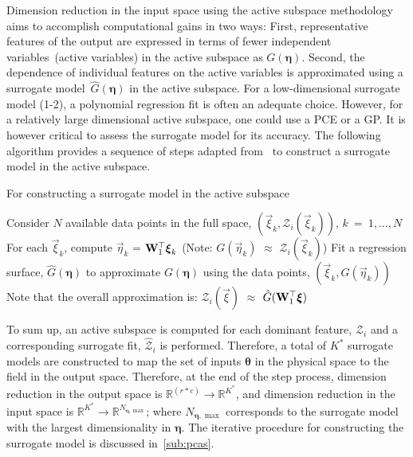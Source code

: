 Dimension reduction in the input space using the active subspace methodology aims to accomplish
computational gains in two ways: First, representative features of the
output are expressed in terms of fewer independent variables~(active variables) in the active subspace 
as $G(\bm{\eta})$. Second, the dependence of individual features on the active variables is approximated 
using a surrogate model~$\hat{G}(\bm{\eta})$ in the active subspace. For a low-dimensional surrogate
model (1-2), a polynomial regression fit is often an adequate choice. 
However, for a relatively large dimensional active subspace, one could
use a PCE or a GP. It is however critical to assess the surrogate model for its accuracy. 
The following algorithm provides a sequence of steps adapted from~\cite{Constantine:2015} to construct a
surrogate model in the active subspace.
%
\bigskip
\begin{breakablealgorithm}
\renewcommand{\algorithmicrequire}{\textbf{Input:}}
\renewcommand{\algorithmicensure}{\textbf{Output:}}
  \caption{For constructing a surrogate model in the active subspace}
  \begin{algorithmic}[1]
	  \State Consider $N$ available data points in the full space, $(\vec\xi_k,\mathcal{Z}_i(\vec\xi_k))$, $k~=~1,\ldots,N$
	  \State For each $\vec\xi_k$, compute $\vec\eta_k$ = $\mat{W}_1^\top\vec\xi_k$ 
          (Note: $G(\vec{\eta}_k)$ $\approx$ $\mathcal{Z}_i(\vec{\xi}_k)$)
	  \State Fit a regression surface, $\hat{G}(\bm{\eta})$ to approximate $G(\bm{\eta})$ using the data
                 points, $(\vec\xi_k,G(\vec\eta_k))$
	  \State Note that the overall approximation is: $\mathcal{Z}_i(\vec{\xi})$ $\approx$
                 $\hat{G}(\mat{W}_1^\top\vec{\xi})$ 
	\EndProcedure
  \end{algorithmic}
  \label{alg:surr}
\end{breakablealgorithm} 
\bigskip
%

To sum up, an active subspace is computed for each dominant feature, $\mathcal{Z}_i$ and a corresponding
surrogate fit, $\hat{\mathcal{Z}}_i$ is performed. Therefore, a total of $K^\ast$ surrogate models are constructed
to map the set of inputs $\bm{\theta}$ in the physical space to the field in the output space. 
Therefore, at the end of the step process, dimension reduction in the output space is 
$\mathbb{R}^{(r\ast c)}\rightarrow \mathbb{R}^{K^\ast}$, and dimension reduction in the input space
is $\mathbb{R}^{K^\ast}\rightarrow \mathbb{R}^{N_{\bm{\eta},\max}}$; 
where $N_{\bm{\eta},\max}$ corresponds to the surrogate model with the largest dimensionality in $\bm{\eta}$.
The iterative procedure for constructing the surrogate model is
discussed in~\ref{sub:pcas}.

